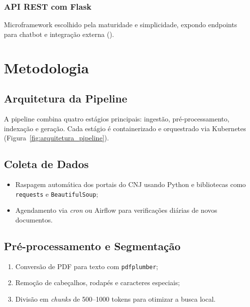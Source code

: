 \subsection{API REST com Flask}
Microframework escolhido pela maturidade e simplicidade, expondo endpoints para chatbot e integração externa (\cite{flask2024}).



\chapter{Metodologia}
\label{chap:metodologia}

\section{Arquitetura da Pipeline}
A pipeline combina quatro estágios principais: ingestão, pré‐processamento, indexação e geração. Cada estágio é containerizado e orquestrado via Kubernetes (Figura~\ref{fig:arquitetura_pipeline}).

\section{Coleta de Dados}
\begin{itemize}[label=\textbullet]
  \item Raspagem automática dos portais do CNJ usando Python e bibliotecas como \texttt{requests} e \texttt{BeautifulSoup};
  \item Agendamento via \emph{cron} ou Airflow para verificações diárias de novos documentos.
\end{itemize}

\section{Pré-processamento e Segmentação}
\begin{enumerate}[label=\arabic*.]
  \item Conversão de PDF para texto com \texttt{pdfplumber};
  \item Remoção de cabeçalhos, rodapés e caracteres especiais;
  \item Divisão em \emph{chunks} de 500--1000 tokens para otimizar a busca local.
\end{enumerate}

